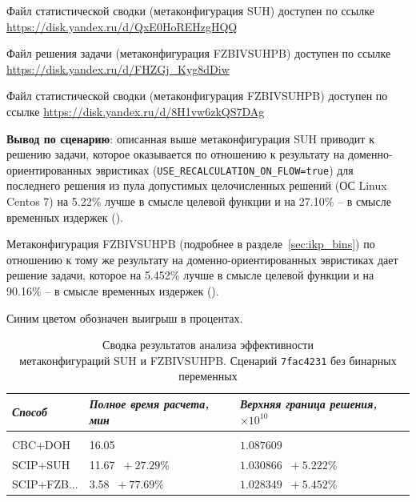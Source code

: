 \documentclass[%
	11pt,
	a4paper,
	utf8,
		]{article}
\begin{document}
Файл статистической сводки (метаконфигурация SUH) доступен по ссылке \url{https://disk.yandex.ru/d/QxE0HoREHzgHQQ}

Файл решения задачи (метаконфигурация FZBIVSUHPB) доступен по ссылке \url{https://disk.yandex.ru/d/FHZGj_Kyg8dDiw}

Файл статистической сводки (метаконфигурация FZBIVSUHPB) доступен по ссылке \url{https://disk.yandex.ru/d/8H1vw6zkQS7DAg}

\vspace*{3mm}
\textbf{Вывод по сценарию}: описанная выше метаконфигурация SUH приводит к решению задачи, которое оказывается по отношению к результату на доменно-ориентированных эвристиках (\verb|USE_RECALCULATION_ON_FLOW=true|) для последнего решения из пула допустимых целочисленных решений (ОС Linux Centos 7) на 5.22\% лучше в смысле целевой функции и на 27.10\% -- в смысле временных издержек ().

Метаконфигурация FZBIVSUHPB (подробнее в разделе~\ref{sec:ikp_bins}) по отношению к тому же результату на доменно-ориентированных эвристиках дает решение задачи, которое на 5.452\% лучше в смысле целевой функции и на 90.16\% -- в смысле временных издержек ().

Синим цветом обозначен выигрыш в процентах.

{
	\begin{table}[!h]
		\centering
		\caption{Сводка результатов анализа эффективности \\метаконфигураций SUH и FZBIVSUHPB. Сценарий \texttt{7fac4231} без бинарных переменных}
		\begin{tabular}{ p{2.5cm} p{3.3cm} p{3.4cm} }
			\emph{Способ} & \emph{Полное время расчета, мин} & \emph{Верхняя граница решения, $ \times 10^{10} $} \\
			\hline\hline\\[-3.5mm]
			{CBC+DOH} & 16.05 & $ 1.087609 $ \\
			\hline
			SCIP+SUH & 11.67 {\color{blue} $\ +27.29 $\%} & $ 1.030866 $ {\color{blue} $\ +5.222 $\%} \\
			\hline
			SCIP+FZB... & 3.58 {\color{blue} $\ +77.69 $\%} & $ 1.028349 $ {\color{blue} $\ +5.452 $\%} \\
		\end{tabular}\label{tab:7fac4231_wo_bins}
	\end{table}
}
\end{document}
